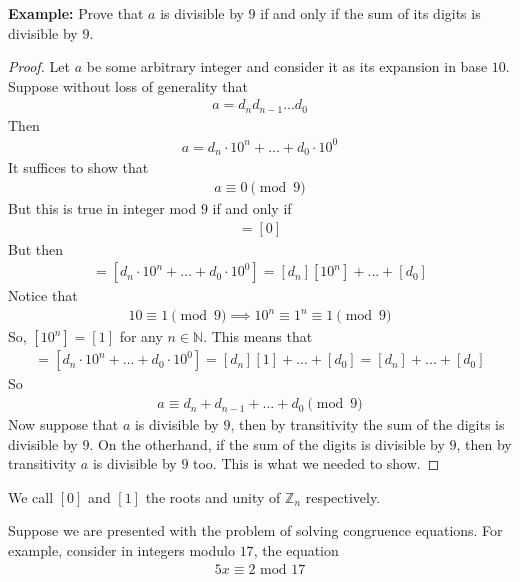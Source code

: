 \documentclass{article}
\begin{document}
\textbf{Example:}
Prove that $a$ is divisible by $9$ if and only if the sum of its digits is divisible by $9$.
\begin{proof}
    Let $a$ be some arbitrary integer and consider it as its expansion in base $10$.
    Suppose without loss of generality that
    \begin{align*}
        a=d_nd_{n-1}...d_0
    \end{align*}
    Then
    \begin{align*}
        a=d_n\cdot10^n + ...+ d_0 \cdot 10^0
    \end{align*}
    It suffices to show that
    \begin{align*}
        a \equiv 0 \pmod{9}
    \end{align*}
    But this is true in integer mod $9$ if and only if 
    \begin{align*}
        [a]=[0]
    \end{align*}
    But then
    \begin{align*}
        [a]=[d_n\cdot10^n + ...+ d_0 \cdot 10^0]=[d_n][10^n]+...+[d_0]
    \end{align*}
    Notice that
    \begin{align*}
        10\equiv 1 \pmod{9}
        \implies 10^n \equiv 1^n \equiv 1\pmod{9}
    \end{align*}
    So, $[10^n]=[1]$ for any $n\in\mathbb{N}$. This means that
    \begin{align*}
        [a]=[d_n\cdot10^n + ...+ d_0 \cdot 10^0]=[d_n][1]+...+[d_0]= [d_n]+...+[d_0]
    \end{align*}
    So 
    \begin{align*}
        a \equiv d_n+d_{n-1}+...+d_0 \pmod{9}
    \end{align*}
    Now suppose that $a$ is divisible by $9$, then by transitivity the sum of the digits is divisible by $9$. On the otherhand, if the sum
    of the digits is divisible by $9$, then by transitivity $a$ is divisible by $9$ too. This is what we needed to show.
    
\end{proof}
\begin{definition}
    We call $[0]$ and $[1]$ the roots and unity of $\mathbb{Z}_n$ respectively.
\end{definition}
Suppose we are presented with the problem of solving congruence equations. For example, consider
in integers modulo $17$, the equation
\begin{align*}
    5x\equiv 2 \text{ mod } 17
\end{align*}
\end{document}
